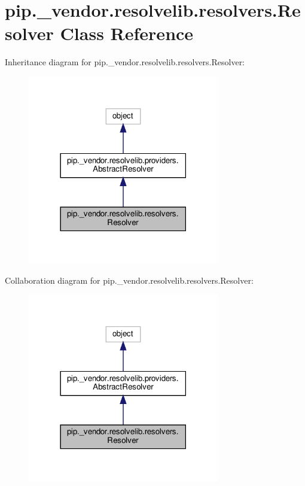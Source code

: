 \hypertarget{classpip_1_1__vendor_1_1resolvelib_1_1resolvers_1_1Resolver}{}\section{pip.\+\_\+vendor.\+resolvelib.\+resolvers.\+Resolver Class Reference}
\label{classpip_1_1__vendor_1_1resolvelib_1_1resolvers_1_1Resolver}


Inheritance diagram for pip.\+\_\+vendor.\+resolvelib.\+resolvers.\+Resolver\+:
\nopagebreak
\begin{figure}[H]
\begin{center}
\leavevmode
\includegraphics[width=237pt]{classpip_1_1__vendor_1_1resolvelib_1_1resolvers_1_1Resolver__inherit__graph}
\end{center}
\end{figure}


Collaboration diagram for pip.\+\_\+vendor.\+resolvelib.\+resolvers.\+Resolver\+:
\nopagebreak
\begin{figure}[H]
\begin{center}
\leavevmode
\includegraphics[width=237pt]{classpip_1_1__vendor_1_1resolvelib_1_1resolvers_1_1Resolver__coll__graph}
\end{center}
\end{figure}
